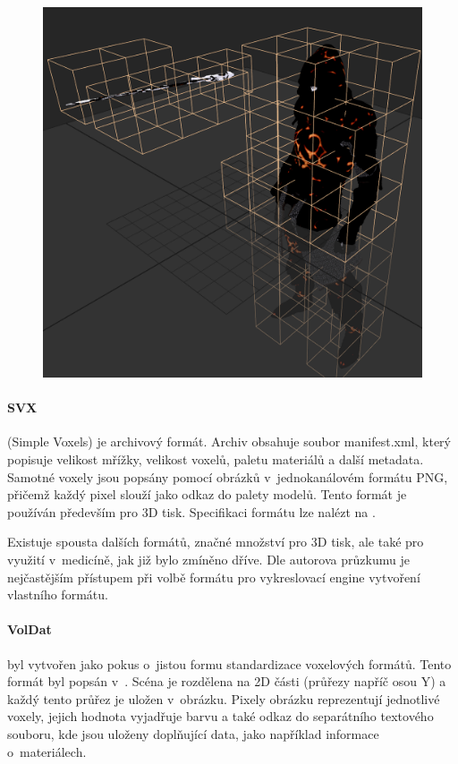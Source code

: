 \begin{figure}[H]
	\centering
	\includegraphics[scale=0.5]{images/magica_voxel_vox.png}
	\captionsetup{justification=centering}
	\label{fig:magica_vox}
\end{figure}

\paragraph{SVX} (Simple Voxels) je archivový formát. Archiv obsahuje soubor manifest.xml, který popisuje velikost mřížky, velikost voxelů, paletu materiálů a další metadata. Samotné voxely jsou popsány pomocí obrázků v~jednokanálovém formátu PNG, přičemž každý pixel slouží jako odkaz do palety modelů. Tento formát je používán především pro 3D tisk. Specifikaci formátu lze nalézt na \cite{svx_format_2014}.

Existuje spousta dalších formátů, značné množství pro 3D tisk, ale také pro využití v~medicíně, jak již bylo zmíněno dříve. Dle autorova průzkumu je nejčastějším přístupem při volbě formátu pro vykreslovací engine vytvoření vlastního formátu.

\paragraph{VolDat} byl vytvořen jako pokus o~jistou formu standardizace voxelových formátů. Tento formát byl popsán v~\cite{williams_2013}. Scéna je rozdělena na 2D části (průřezy napříč osou Y) a každý tento průřez je uložen v~obrázku. Pixely obrázku reprezentují jednotlivé voxely, jejich hodnota vyjadřuje barvu a také odkaz do separátního textového souboru, kde jsou uloženy doplňující data, jako například informace o~materiálech.



